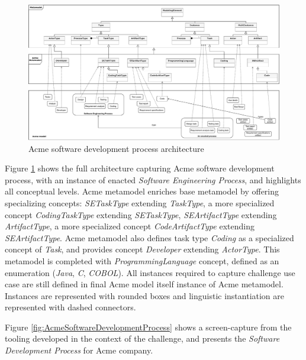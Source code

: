 \begin{figure}
 \centering
     \includegraphics[width=1.0 \textwidth]{Figures/AcmeFullArchitecture.pdf}
     \caption{Acme software development process architecture}
    \label{fig:AcmeFullArchitecture}
\end{figure}


Figure \ref{fig:AcmeFullArchitecture} shows the full architecture capturing Acme software development process, with an instance of enacted \textit{Software Engineering Process}, and highlights all conceptual levels. Acme metamodel enriches base metamodel by offering specializing concepts: \textit{SETaskType} extending \textit{TaskType}, a more specialized concept \textit{CodingTaskType} extending \textit{SETaskType}, \textit{SEArtifactType} extending \textit{ArtifactType}, a more specialized concept \textit{CodeArtifactType} extending \textit{SEArtifactType}. Acme metamodel also defines task type \textit{Coding} as a specialized concept of \textit{Task}, and provides concept \textit{Developer} extending \textit{ActorType}. This metamodel is completed with \textit{ProgrammingLanguage} concept, defined as an enumeration (\textit{Java}, \textit{C}, \textit{COBOL}). All instances required to capture challenge use case are still defined in final Acme model itself instance of Acme metamodel. Instances are represented with rounded boxes and linguistic instantiation are represented with dashed connectors.

Figure \ref{fig:AcmeSoftwareDevelopmentProcess} shows a screen-capture from the tooling developed in the context of the challenge, and presents the \textit{Software Development Process} for Acme company. 


